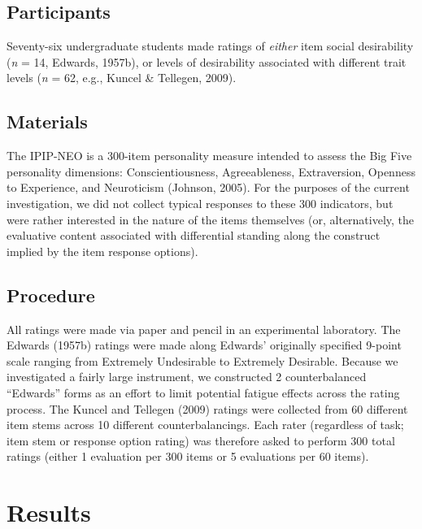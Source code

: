 \documentclass[
  ,jou]{apa6}
\begin{document}
\hypertarget{participants}{%
\subsection{Participants}\label{participants}}

Seventy-six undergraduate students made ratings of \emph{either} item social desirability (\emph{n} = 14, Edwards, 1957b), or levels of desirability associated with different trait levels (\emph{n} = 62, e.g., Kuncel \& Tellegen, 2009).

\hypertarget{materials}{%
\subsection{Materials}\label{materials}}

The IPIP-NEO is a 300-item personality measure intended to assess the Big Five personality dimensions: Conscientiousness, Agreeableness, Extraversion, Openness to Experience, and Neuroticism (Johnson, 2005). For the purposes of the current investigation, we did not collect typical responses to these 300 indicators, but were rather interested in the nature of the items themselves (or, alternatively, the evaluative content associated with differential standing along the construct implied by the item response options).

\hypertarget{procedure}{%
\subsection{Procedure}\label{procedure}}

All ratings were made via paper and pencil in an experimental laboratory. The Edwards (1957b) ratings were made along Edwards' originally specified 9-point scale ranging from Extremely Undesirable to Extremely Desirable. Because we investigated a fairly large instrument, we constructed 2 counterbalanced ``Edwards'' forms as an effort to limit potential fatigue effects across the rating process. The Kuncel and Tellegen (2009) ratings were collected from 60 different item stems across 10 different counterbalancings. Each rater (regardless of task; item stem or response option rating) was therefore asked to perform 300 total ratings (either 1 evaluation per 300 items or 5 evaluations per 60 items).

\hypertarget{results}{%
\section{Results}\label{results}}
\end{document}
